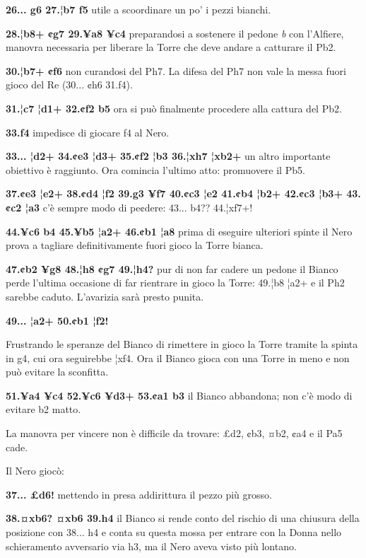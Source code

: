 \textbf{26... g6 27.¦b7 f5} utile a scoordinare un po' i pezzi bianchi.

\textbf{28.¦b8+ ¢g7 29.¥a8 ¥c4} preparandosi a sostenere il pedone
\emph{b} con l'Alfiere, manovra necessaria per liberare la Torre che
deve andare a catturare il Pb2.

\textbf{30.¦b7+ ¢f6} non curandosi del Ph7. La difesa del Ph7 non vale
la messa fuori gioco del Re (30... ¢h6 31.f4).

\textbf{31.¦c7 ¦d1+ 32.¢f2 b5} ora si può finalmente procedere alla
cattura del Pb2.

\textbf{33.f4} impedisce di giocare f4 al Nero.

\textbf{33... ¦d2+ 34.¢e3 ¦d3+ 35.¢f2 ¦b3 36.¦xh7 ¦xb2+} un altro
importante obiettivo è raggiunto. Ora comincia l'ultimo atto: promuovere
il Pb5.

\textbf{37.¢e3 ¦e2+ 38.¢d4 ¦f2 39.g3 ¥f7 40.¢c3 ¦e2 41.¢b4 ¦b2+ 42.¢c3
¦b3+ 43.¢c2 ¦a3} c'è sempre modo di pe¢dere: 43... b4?? 44.¦xf7+!

\textbf{44.¥c6 b4 45.¥b5 ¦a2+ 46.¢b1 ¦a8} prima di eseguire ulteriori
spinte il Nero prova a tagliare definitivamente fuori gioco la Torre
bianca.

\textbf{47.¢b2 ¥g8 48.¦h8 ¢g7 49.¦h4?} pur di non far cadere un pedone
il Bianco perde l'ultima occasione di far rientrare in gioco la Torre:
49.¦b8 ¦a2+ e il Ph2 sarebbe caduto. L'avarizia sarà presto punita.

\textbf{49... ¦a2+ 50.¢b1 ¦f2!}


Frustrando
le speranze del Bianco di rimettere in gioco la Torre tramite la spinta
in g4, cui ora seguirebbe ¦xf4. Ora il Bianco gioca con una Torre in
meno e non può evitare la sconfitta.

\textbf{51.¥a4 ¥c4 52.¥c6 ¥d3+ 53.¢a1 b3} il Bianco abbandona; non c'è
modo di evitare b2 matto.


La manovra per vincere non è difficile da trovare: £d2, ¢b3, ¤b2, ¢a4 e
il Pa5 cade.

Il Nero giocò:

\textbf{37... £d6!} mettendo in presa addirittura il pezzo più grosso.

\textbf{38.¤xb6? ¤xb6 39.h4} il Bianco si rende conto del rischio di una
chiusura della posizione con 38... h4 e conta su questa mossa per
entrare con la Donna nello schieramento avversario via h3, ma il Nero
aveva visto più lontano.

